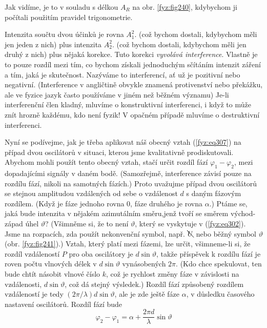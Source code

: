 {    Jak vidíme, je to v souladu s délkou \(A_R\) na obr. \ref{fyz:fig240}, kdybychom ji počítali 
    použitím pravidel trigonometrie. 
    
    Intenzita součtu dvou účinků je rovna \(A_1^2\). (což bychom dostali, kdybychom měli jen jeden 
    z nich) plus intenzita \(A_2^2\). (což bychom dostali, kdybychom měli jen druhý z nich) plus 
    nějaká korekce. Tuto korekci \emph{vyvolává interference}. Vlastně je to pouze rozdíl mezi tím, 
    co bychom získali jednoduchým sčítáním intenzit záření a tím, jaká je skutečnost. Nazýváme to 
    interferencí, ať už je pozitivní nebo negativní. (Interference v angličtině obvykle znamená 
    protivenství nebo překážku, ale ve fyzice jazyk často používáme v jiném než běžném významu) 
    Je-li interferenční člen kladný, mluvíme o konstruktivní interferenci, i když to může znít 
    hrozně každému, kdo není fyzik! V opačném případě mluvíme o destruktivní interferenci. 
    
    Nyní se podívejme, jak je třeba aplikovat náš obecný vztah (\ref{fyz:eq307}) na případ dvou 
    oscilátorů v situaci, kterou jsme kvalitativně prodiskutovali. Abychom mohli použít tento 
    obecný vztah, stačí určit rozdíl fází \(\varphi_1-\varphi_2\), mezi dopadajícími signály v 
    daném bodě. (Samozřejmě, interference závisí pouze na rozdílu fází, nikoli na samotných 
    fázích.) Proto uvažujme případ dvou oscilátorů se stejnou amplitudou vzdálených od sebe o 
    vzdálenost \(d\) s daným fázovým rozdílem. (Když je fáze jednoho rovna \(0\), fáze druhého je 
    rovna \(\alpha\).) Ptáme se, jaká bude intenzita v nějakém azimutálním směru,jenž tvoří se 
    směrem východ-západ úhel \(\vartheta\)? (Všimněme si, že to není \(\vartheta\), který se 
    vyskytuje v (\ref{fyz:eq302}). Jsme na rozpacích, zda použít nekonvenční symbol, např. 
    \(\bcancel{U}\) nebo běžný symbol \(\vartheta\) (obr. \ref{fyz:fig241}).) Vztah, který platí 
    mezi fázemi, lze určit, všimneme-li si, že rozdíl vzdáleností \(P\) pro oba oscilátory je 
    \(d\sin\vartheta\), takže příspěvek k rozdílu fází je roven počtu vlnových délek v 
    \(d\sin\vartheta\) vynásobených \(2\pi\). (Kdo chce spekulovat, ten bude chtít násobit vlnové 
    číslo \(k\), což je rychlost změny fáze v závislosti na vzdálenosti, \(d\sin\vartheta\), což dá 
    stejný výsledek.) Rozdíl fází způsobený rozdílem vzdáleností je tedy 
    \((2\pi/\lambda)d\sin\vartheta\), ale je zde ještě fáze \(\alpha\), v důsledku časového 
    nastavení oscilátorů. Rozdíl fází bude
    \begin{equation}\label{fyz:eq315}
      \varphi_2-\varphi_1 = \alpha  + \frac{2\pi d}{\lambda}\sin\vartheta
    \end{equation}
    
}
